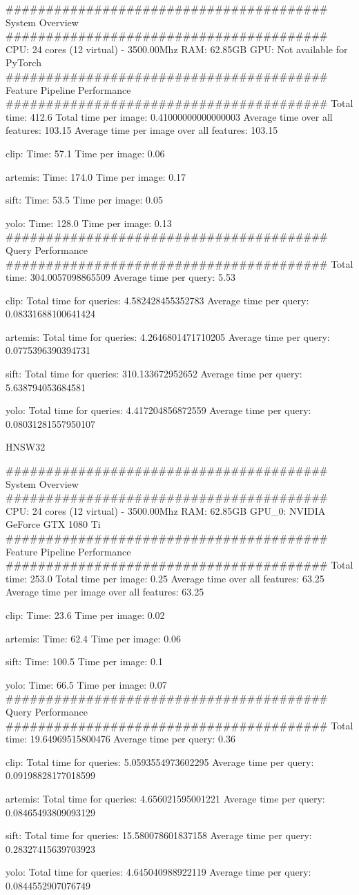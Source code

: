 ######################################## System Overview ########################################
CPU: 24 cores (12 virtual) - 3500.00Mhz
RAM: 62.85GB
GPU: Not available for PyTorch
######################################## Feature Pipeline Performance ########################################
Total time: 412.6
Total time per image: 0.41000000000000003
Average time over all features: 103.15
Average time per image over all features: 103.15

  clip:
  Time: 57.1
  Time per image: 0.06 

  artemis:
  Time: 174.0
  Time per image: 0.17 

  sift:
  Time: 53.5
  Time per image: 0.05 

  yolo:
  Time: 128.0
  Time per image: 0.13 
######################################## Query Performance ########################################
Total time: 304.0057098865509
Average time per query: 5.53

  clip:
  Total time for queries: 4.582428455352783
  Average time per query: 0.08331688100641424

  artemis:
  Total time for queries: 4.2646801471710205
  Average time per query: 0.0775396390394731

  sift:
  Total time for queries: 310.133672952652
  Average time per query: 5.638794053684581

  yolo:
  Total time for queries: 4.417204856872559
  Average time per query: 0.08031281557950107





HNSW32

######################################## System Overview ########################################
CPU: 24 cores (12 virtual) - 3500.00Mhz
RAM: 62.85GB
GPU_0: NVIDIA GeForce GTX 1080 Ti
######################################## Feature Pipeline Performance ########################################
Total time: 253.0
Total time per image: 0.25
Average time over all features: 63.25
Average time per image over all features: 63.25

  clip:
  Time: 23.6
  Time per image: 0.02 

  artemis:
  Time: 62.4
  Time per image: 0.06 

  sift:
  Time: 100.5
  Time per image: 0.1 

  yolo:
  Time: 66.5
  Time per image: 0.07 
######################################## Query Performance ########################################
Total time: 19.64969515800476
Average time per query: 0.36

  clip:
  Total time for queries: 5.0593554973602295
  Average time per query: 0.09198828177018599

  artemis:
  Total time for queries: 4.656021595001221
  Average time per query: 0.08465493809093129

  sift:
  Total time for queries: 15.580078601837158
  Average time per query: 0.28327415639703923

  yolo:
  Total time for queries: 4.645040988922119
  Average time per query: 0.0844552907076749
